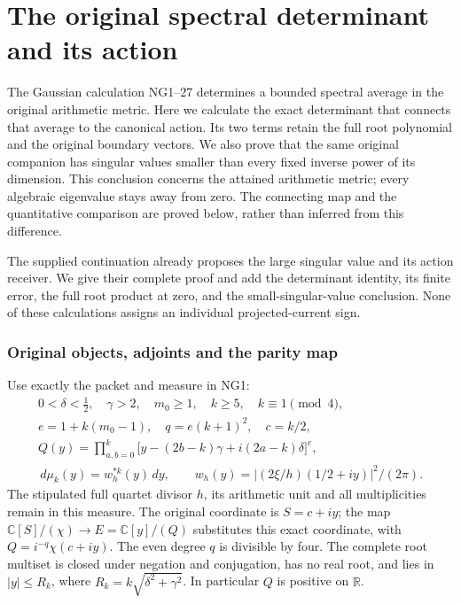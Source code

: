 

\clearpage\begingroup
\part*{The original spectral determinant and its action}
\newcommand{\osdR}{\mathbb R}\newcommand{\osdC}{\mathbb C}
\newcommand{\osdPP}{\mathcal P}\newcommand{\osddd}{\,d}
\newcommand{\osdnorm}[1]{\left\lVert#1\right\rVert}
\newcommand{\osdTr}{\operatorname{Tr}}\newcommand{\osdrank}{\operatorname{rank}}
\newtheorem{osdtheorem}{Theorem}\newtheorem{osdlemma}[osdtheorem]{Lemma}


The Gaussian calculation NG1--27 \cite{osd:NG} determines a bounded spectral
average in the original arithmetic metric. Here we calculate the exact
determinant that connects that average to the canonical action. Its two
terms retain the full root polynomial and the original boundary vectors.
We also prove that the same original companion has singular values smaller
than every fixed inverse power of its dimension. This conclusion concerns
the attained arithmetic metric; every algebraic eigenvalue stays away
from zero. The connecting map and the quantitative comparison are proved
below, rather than inferred from this difference.

The supplied continuation \cite[Section 5]{osd:incoming} already proposes the
large singular value and its action receiver. We give their complete
proof and add the determinant identity, its finite error, the full root
product at zero, and the small-singular-value conclusion. None of these
calculations assigns an individual projected-current sign.

\section{Original objects, adjoints and the parity map}
Use exactly the packet and measure in NG1:
\begin{equation}\tag{SD1}
\begin{gathered}
0<\delta<\tfrac12,\quad\gamma>2,\quad m_0\ge1,\quad
k\ge5,\quad k\equiv1\pmod4,\\
e=1+k(m_0-1),\quad q=e(k+1)^2,\quad c=k/2,\\
Q(y)=\prod_{a,b=0}^k
\bigl[y-(2b-k)\gamma+i(2a-k)\delta\bigr]^e,\\
\osddd\mu_k(y)=w_h^{*k}(y)\osddd y,\qquad
w_h(y)=|(2\xi/h)(1/2+iy)|^2/(2\pi).
\end{gathered}
\end{equation}
The stipulated full quartet divisor $h$, its arithmetic unit and all
multiplicities remain in this measure. The original coordinate is
$S=c+iy$; the map $\osdC[S]/(\chi)\to E=\osdC[y]/(Q)$ substitutes this exact
coordinate, with $Q=i^{-q}\chi(c+iy)$. The even degree $q$ is divisible
by four. The complete root multiset is closed under negation and
conjugation, has no real root, and lies in $|y|\le R_k$, where
$R_k=k\sqrt{\delta^2+\gamma^2}$. In particular $Q$ is positive on $\osdR$.

